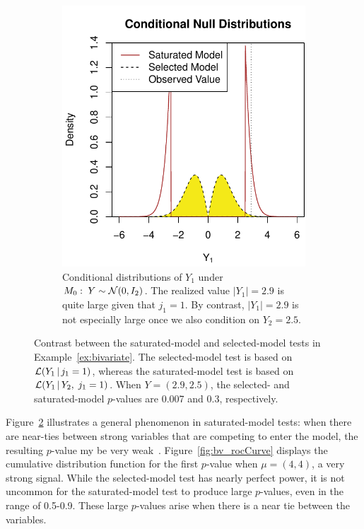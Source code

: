 \documentclass{article}
\begin{document}
\begin{figure}
\begin{subfigure}[t]{.4\textwidth}
    \includegraphics[width=\textwidth]{figs/bivariateSelVSat_nullDists.pdf}
    \caption{Conditional distributions of $Y_1$ under
      $M_0:\; Y \sim \mathcal{N}(0,I_2)$. The realized value $|Y_1|=2.9$ is
      quite large given that $j_1=1$. By
      contrast, $|Y_1|=2.9$ is not especially large once we 
      also condition on $Y_2=2.5$.}
  \label{fig:bv_nullDists}
  \end{subfigure}
  \caption{Contrast between the saturated-model and selected-model
    tests in Example~\ref{ex:bivariate}. The selected-model test is based on  $\mathcal{L}(Y_1 \,|\, j_1=1)$,  whereas the saturated-model test is based on $\mathcal{L}(Y_1  \,|\, Y_2, \; j_1=1)$. 
    When $Y=(2.9, 2.5)$, the selected- and saturated-model $p$-values are 0.007 and 0.3, respectively.}
  \label{fig:bv}
\end{figure}

Figure~\ref{fig:bv} illustrates a general phenomenon in saturated-model tests: when there are near-ties between strong variables that are competing to enter the model, the resulting $p$-value my be very weak~\citep{lockhart2014significance}. Figure~\ref{fig:bv_rocCurve} displays the cumulative distribution function for the first $p$-value when $\mu=(4,4)$, a very strong signal. While the selected-model test has nearly perfect power, it is not uncommon for the saturated-model test to produce large $p$-values, even in the range of 0.5-0.9. These large $p$-values arise when there is a near tie between the variables.
\end{document}
